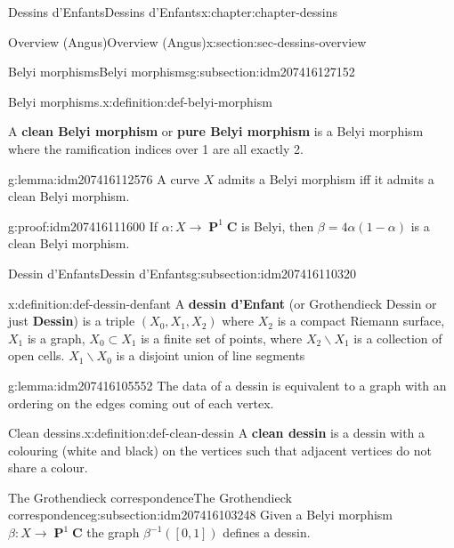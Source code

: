 \documentclass[oneside,10pt,]{book}
\newcommand{\terminology}[1]{\textbf{#1}}
\numberwithin{equation}{section}
\newcommand{\lb}{[}
\newcommand{\rb}{]}
\newcommand{\CC}{\mathbf{C}}
\DeclareMathOperator{\PP}{\mathbf{P}}
\begin{document}
\begin{chapterptx}{Dessins d'Enfants}{}{Dessins d'Enfants}{}{}{x:chapter:chapter-dessins}
\begin{sectionptx}{Overview (Angus)}{}{Overview (Angus)}{}{}{x:section:sec-dessins-overview}
\begin{subsectionptx}{Belyi morphisms}{}{Belyi morphisms}{}{}{g:subsection:idm207416127152}
\begin{definition}{Belyi morphisms.}{x:definition:def-belyi-morphism}
\par
A \terminology{clean Belyi morphism} or \terminology{pure Belyi morphism} is a Belyi morphism where the ramification indices over 1 are all exactly 2.%
\end{definition}
\begin{lemma}{}{}{g:lemma:idm207416112576}%
A curve \(X\) admits a Belyi morphism iff it admits a clean Belyi morphism.%
\end{lemma}
\begin{proofptx}{}{g:proof:idm207416111600}
If \(\alpha \colon X\to \PP^1 \CC\) is Belyi, then \(\beta = 4\alpha(1-\alpha)\) is a clean Belyi morphism.%
\end{proofptx}
\end{subsectionptx}
%
%
\typeout{************************************************}
\typeout{************************************************}
%
\begin{subsectionptx}{Dessin d'Enfants}{}{Dessin d'Enfants}{}{}{g:subsection:idm207416110320}
\begin{definition}{}{x:definition:def-dessin-denfant}%
A \terminology{dessin d'Enfant} (or Grothendieck Dessin or just \terminology{Dessin}) is a triple \((X_0,X_1,X_2)\) where \(X_2\) is a compact Riemann surface, \(X_1\) is a graph, \(X_0 \subset X_1\) is a finite set of points, where \(X_2 \smallsetminus X_1\) is a collection of open cells. \(X_1 \smallsetminus X_0\) is a disjoint union of line segments%
\end{definition}
\begin{lemma}{}{}{g:lemma:idm207416105552}%
The data of a dessin is equivalent to a graph with an ordering on the edges coming out of each vertex.%
\end{lemma}
\begin{definition}{Clean dessins.}{x:definition:def-clean-dessin}%
A \terminology{clean dessin} is a dessin with a colouring (white and black) on the vertices such that adjacent vertices do not share a colour.%
\end{definition}
\end{subsectionptx}
%
%
\typeout{************************************************}
\typeout{************************************************}
%
\begin{subsectionptx}{The Grothendieck correspondence}{}{The Grothendieck correspondence}{}{}{g:subsection:idm207416103248}
Given a Belyi morphism \(\beta\colon X \to \PP^1 \CC\) the graph \(\beta^{-1}(\lb 0,1\rb)\) defines a dessin.%

\end{subsectionptx}
\end{sectionptx}
\end{chapterptx}
\end{document}
